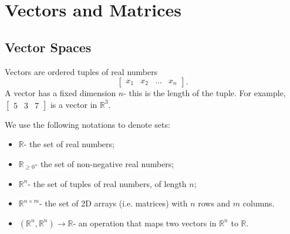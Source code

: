 \documentclass[a4paper, openany]{memoir}
\begin{document}
    \chapter{Vectors and Matrices}
    \section{Vector Spaces}
    Vectors are ordered tuples of real numbers
    \[\begin{bmatrix}
        x_1 & x_2 & \dots & x_n
    \end{bmatrix}.\]
    A vector has a fixed dimension $n$- this is the length of the tuple. For example, $\begin{bmatrix}
        5 & 3 & 7
    \end{bmatrix}$ is a vector in $\mathbb{R}^3$.

    We use the following notations to denote sets:
    \begin{itemize}
        \item $\mathbb{R}$- the set of real numbers;
        \item $\mathbb{R}_{\geqslant 0}$- the set of non-negative real numbers;
        \item $\mathbb{R}^n$- the set of tuples of real numbers, of length $n$;
        \item $\mathbb{R}^{n \times m}$- the set of 2D arrays (i.e. matrices) with $n$ rows and $m$ columns.
        \item $(\mathbb{R}^n, \mathbb{R}^n) \to \mathbb{R}$- an operation that maps two vectors in $\mathbb{R}^n$ to $\mathbb{R}$.
    \end{itemize}
\end{document}
